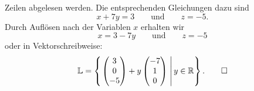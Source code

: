 \begin{loesung}
\begin{teilaufgaben}
Zeilen abgelesen werden.
Die entsprechenden Gleichungen dazu sind
\[
x+7y=3
\qquad\text{und}\qquad
z=-5.
\]
Durch Auflösen nach der Variablen $x$ erhalten wir
\[
x = 3-7y
\qquad\text{und}\qquad
z=-5
\]
oder in Vektorschreibweise:
\[
\mathbb L =\left\{\left.
\begin{pmatrix}
3\\
0\\
-5
\end{pmatrix}
+y
\begin{pmatrix}
-7\\
 1\\
 0
\end{pmatrix}
\;
\right|
y\in \mathbb R
\right\}.
\qedhere
\]
\end{teilaufgaben}
\end{loesung}

